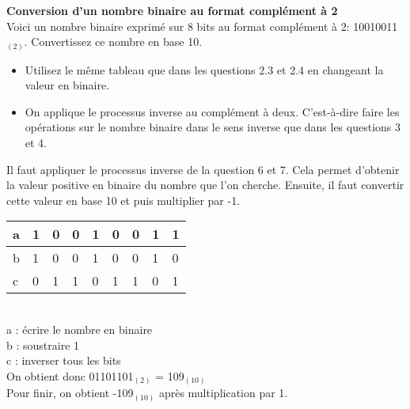 \begin{Exercice}[15 minutes] \textbf{Conversion d'un nombre binaire au format complément à 2}\\
    
    Voici un nombre binaire exprimé sur 8 bits au format complément à 2: 10010011$_{(2)}$. Convertissez ce nombre en base 10. \\
	
    \begin{conseil}
    
    \begin{itemize}
    	\item Utilisez le même tableau que dans les questions 2.3 et 2.4 en changeant la valeur en binaire.
    	\item On applique le processus inverse au complément à deux. C'est-à-dire faire les opérations sur le nombre binaire dans le sens inverse que dans les questions 3 et 4.
    \end{itemize}
    
    \end{conseil}
    
    \begin{solution}
       Il faut appliquer le processus inverse de la question 6 et 7. Cela permet d'obtenir la valeur positive en binaire du nombre que l'on cherche. Ensuite, il faut convertir cette valeur en base 10 et puis multiplier par -1. \\
       
       \begin{tabular}{| p{1cm} | p{1cm} | p{1cm} | p{1cm} | p{1cm} | p{1cm} | p{1cm} | p{1cm} | p{1cm} |} 
            \hline
            a & 1 & 0 & 0 & 1 & 0 & 0 & 1 & 1 \\ [0.5ex] 
            \hline
            b & 1 & 0 & 0 & 1 & 0 & 0 & 1 & 0 \\ [0.5ex]
            \hline
            c & 0 & 1 & 1 & 0 & 1 & 1 & 0 & 1 \\ [0.5ex]
            \hline
        \end{tabular} \\
        
        a : écrire le nombre en binaire \\
        
        b : soustraire 1 \\
        
        c : inverser tous les bits \\
        
        On obtient donc 01101101$_{(2)}$ = 109$_{(10)}$ \\
        
        Pour finir, on obtient -109$_{(10)}$ après multiplication par 1.
       
    \end{solution}
\end{Exercice}


